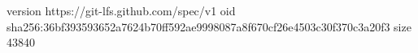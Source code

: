 version https://git-lfs.github.com/spec/v1
oid sha256:36bf393593652a7624b70ff592ae9998087a8f670cf26e4503c30f370c3a20f3
size 43840
